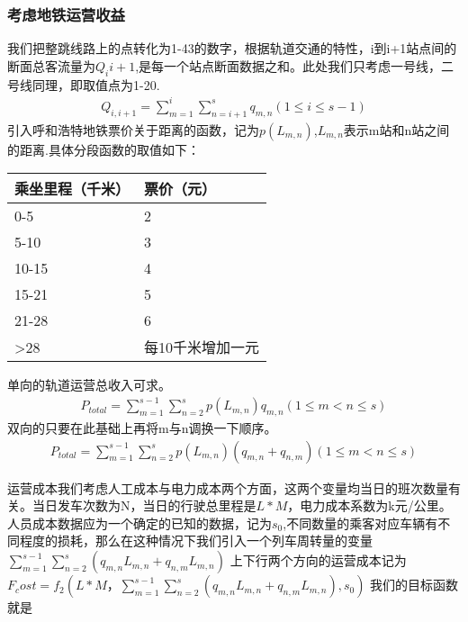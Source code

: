 \documentclass[12pt,a4paper]{mcmthesis}
\begin{document}
\subsubsection{考虑地铁运营收益}
我们把整跳线路上的点转化为1-43的数字，根据轨道交通的特性，i到i+1站点间的断面总客流量为$Q_{i}{i+1}$,是每一个站点断面数据之和。此处我们只考虑一号线，二号线同理，即取值点为1-20.
\begin{equation}
	\begin{aligned}
		Q_{i,i+1}=\sum_{m=1}^{i}\sum_{n=i+1}^{s}q_{m,n}(1\leqslant i\leqslant s-1)
	\end{aligned}
\end{equation}
引入呼和浩特地铁票价关于距离的函数，记为$p(L_{m,n})$,$L_{m,n}$表示m站和n站之间的距离.具体分段函数的取值如下：
\begin{table}
	\centering
	\begin{tabular}{|l|l|}
		\hline
		乘坐里程（千米） & 票价（元） \\ \hline
		0-5 & 2 \\ \hline
		5-10 & 3 \\ \hline
		10-15 & 4 \\ \hline
		15-21 & 5 \\ \hline
		21-28 & 6 \\ \hline
		>28 &  每10千米增加一元 \\ \hline
	\end{tabular}
\end{table}
单向的轨道运营总收入可求。
\begin{equation}
	\begin{aligned}
		P_{total}=\sum_{m=1}^{s-1}\sum_{n=2}^{s}p(L_{m,n})q_{m,n} (1\leqslant m< n\leq s)
	\end{aligned}
\end{equation}
双向的只要在此基础上再将m与n调换一下顺序。
\begin{equation}
	\begin{aligned}
	P_{total}=\sum_{m=1}^{s-1}\sum_{n=2}^{s}p(L_{m,n})(q_{m,n}+q_{n,m}) (1\leqslant m< n\leq s)
	\end{aligned}
\end{equation}

运营成本我们考虑人工成本与电力成本两个方面，这两个变量均当日的班次数量有关。当日发车次数为N，当日的行驶总里程是$L*M$，电力成本系数为k元/公里。人员成本数据应为一个确定的已知的数据，记为$s_0$,不同数量的乘客对应车辆有不同程度的损耗，那么在这种情况下我们引入一个列车周转量的变量$\sum_{m=1}^{s-1}\sum_{n=2}^{s}(q_{m,n}L_{m,n}+q_{n,m}L_{m,n})$
上下行两个方向的运营成本记为$F_cost=f_2(L*M，\sum_{m=1}^{s-1}\sum_{n=2}^{s}(q_{m,n}L_{m,n}+q_{n,m}L_{m,n}),s_0)$
我们的目标函数就是
\end{document}
